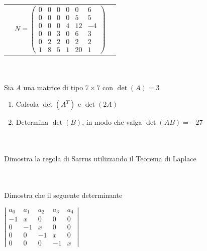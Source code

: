 \documentclass[a4paper,10pt]{article}
\begin{document}
\begin{table}[h!]
\begin{tabular}{ c c c }
    &

    $ N= 
        \left( 
            \begin{matrix} 
                0 & 0 & 0 & 0 & 0 & 6 \\
                0 & 0 & 0 & 0 & 5 & 5 \\
                0 & 0 & 0 & 4 & 12 & -4 \\
                0 & 0 & 3 & 0 & 6 & 3 \\
                0 & 2 & 2 & 0 & 2 & 2 \\
                1 & 8 & 5 & 1 & 20 & 1 
            \end{matrix} 
        \right)
    $

    \\ [6ex] %

    \end{tabular}
\end{table}



\bigskip



 \\\\
    Sia $A$ una matrice di tipo $7 \times 7$ con $\det(A)=3$
    \begin{enumerate}
        \item Calcola $\det(A^{T})$ e $\det(2A)$
        \item Determina $\det(B)$, in modo che valga $\det(AB) = -27$
    \end{enumerate}



\bigskip



 \\\\
    Dimostra la regola di Sarrus utilizzando il Teorema di Laplace



\pagebreak


 \\\\
    Dimostra che il seguente determinante

    \begin{center}
    $ 
        \left|
        \begin{matrix}
            a_{0} & a_{1} & a_{2} & a_{3} & a_{4} \\
            -1 & x & 0 & 0 & 0 \\
            0 & -1 & x & 0 & 0 \\
            0 & 0 & -1 & x & 0 \\
            0 & 0 & 0 & -1 & x 
        \end{matrix}
        \right|
    $
    \end{center}
\end{document}
